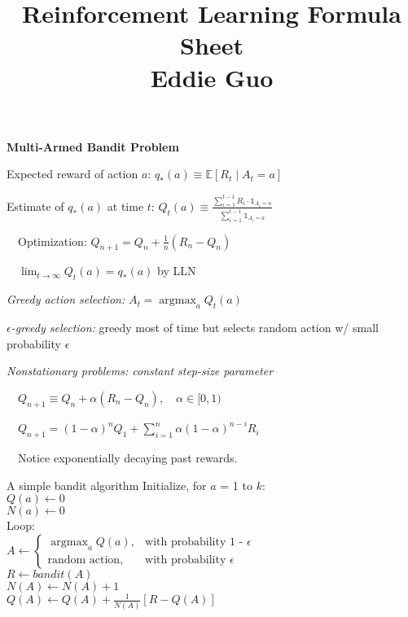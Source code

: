 \documentclass[twocolumn]{article}
\title{
	\vspace{-2em}
	\normalsize \textbf{Reinforcement Learning Formula Sheet} \\
	\small Eddie Guo \\
	\dotfill
	\vspace{-5em}
}
\date{}
\DeclareMathOperator*{\argmax}{argmax}
\begin{document}
\maketitle

\small

\textbf{Multi-Armed Bandit Problem}

Expected reward of action $a$: $q_*(a) \equiv \mathbb E [R_t \mid A_t = a]$

Estimate of $q_*(a)$ at time $t$: $Q_t(a) \equiv \frac{\sum_{i=1}^{t-1} R_i \cdot \mathbb 1_{A_i = a}}{\sum_{i=1}^{t-1} \mathbb 1_{A_i = a}}$

$\quad$Optimization: $Q_{n+1} = Q_n + \frac{1}{n} (R_n - Q_n)$

$\quad \lim_{t \to \infty} Q_t(a) = q_*(a)$ by LLN

\textit{Greedy action selection:} $A_t = \argmax_a Q_t(a)$

\textit{$\epsilon$-greedy selection:} greedy most of time but selects random action w/ small probability $\epsilon$

\textit{Nonstationary problems: constant step-size parameter}

$\quad Q_{n+1} \equiv Q_n + \alpha (R_n - Q_n), \quad \alpha \in [0, 1)$

$\quad Q_{n+1} = (1-\alpha)^n Q_1 + \sum_{i=1}^n \alpha (1-\alpha)^{n-i} R_i$

$\quad$Notice exponentially decaying past rewards.

\begin{mydef}{A simple bandit algorithm}{}
    Initialize, for $a$ = 1 to $k$: \\
        \hspace*{2em} $Q(a) \leftarrow 0$ \\
        \hspace*{2em} $N(a) \leftarrow 0$ \\
    Loop: \\
        \hspace*{2em} $A \leftarrow \begin{cases} \argmax_a Q(a), & \text{with probability 1 - $\epsilon$}\\ \text{random action}, & \text{with probability $\epsilon$} \end{cases}$ \\
        \hspace*{2em} $R \leftarrow bandit(A)$ \\
        \hspace*{2em} $N(A) \leftarrow N(A) + 1$ \\
        \hspace*{2em} $Q(A) \leftarrow Q(A) + \frac{1}{N(A)} [R-Q(A)]$
\end{mydef}
\end{document}
